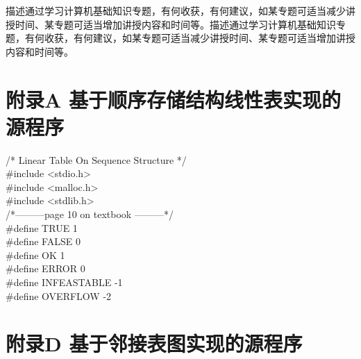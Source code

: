 \documentclass[supercite]{Experimental_Report}
\theoremstyle{definition}
\begin{document}
描述通过学习计算机基础知识专题，有何收获，有何建议，如某专题可适当减少讲授时间、某专题可适当增加讲授内容和时间等。描述通过学习计算机基础知识专题，有何收获，有何建议，如某专题可适当减少讲授时间、某专题可适当增加讲授内容和时间等。


\nocite{*} %



\setcounter{secnumdepth}{0}
\appendix

\section{附录A 基于顺序存储结构线性表实现的源程序}

\noindent
/* Linear Table On Sequence Structure */\\
\#include <stdio.h>\\
\#include <malloc.h>\\
\#include <stdlib.h>\\

\noindent
/*---------page 10 on textbook ---------*/\\
\#define TRUE 1\\
\#define FALSE 0\\
\#define OK 1\\
\#define ERROR 0\\
\#define INFEASTABLE -1\\
\#define OVERFLOW -2\\
\newpage
\section{附录D 基于邻接表图实现的源程序}
\end{document}
